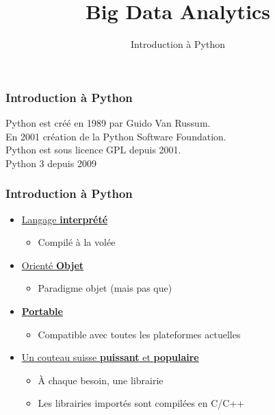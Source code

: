\documentclass{formation}
\title{Big Data Analytics}
\subtitle{Introduction à Python}
\begin{document}
\maketitle

\begin{frame}
  \frametitle{Introduction à Python}
  Python est créé en 1989 par Guido Van Russum. \\
  En 2001 création de la Python Software Foundation. \\
  Python est sous licence GPL depuis 2001. \\
  Python 3 depuis 2009
\end{frame}

\begin{frame}
  \frametitle{Introduction à Python}
  \begin{itemize}
  \item \underline{Langage \textbf{interprété}}
    \begin{itemize}
    \item Compilé à la volée
    \end{itemize}
  \item \underline{Orienté \textbf{Objet}}
    \begin{itemize}
    \item Paradigme objet (mais pas que)
    \end{itemize}
  \item \underline{\textbf{Portable}}
    \begin{itemize}
    \item Compatible  avec toutes les plateformes actuelles
    \end{itemize}
  \item \underline{Un couteau suisse \textbf{puissant} et \textbf{populaire}}
    \begin{itemize}
    \item À chaque besoin, une librairie
    \item Les librairies importés sont compilées en C/C++
    \end{itemize}
  \end{itemize}
\end{frame}
\end{document}
